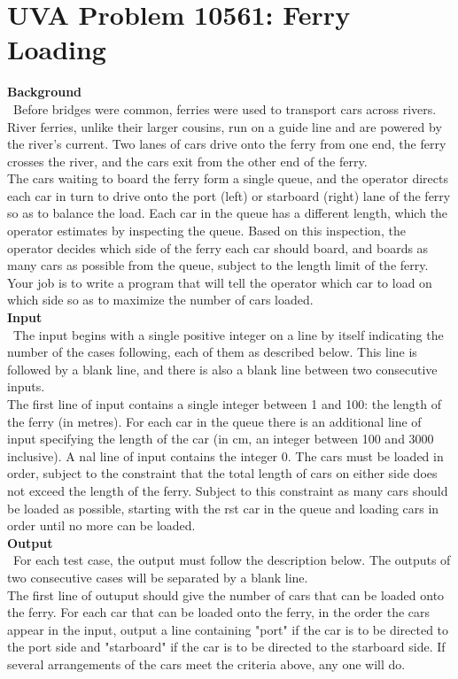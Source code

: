 \documentclass[12pt]{article}
\begin{document}
\section{UVA Problem 10561: Ferry Loading}
\textbf{Background} \\
~\indent Before bridges were common, ferries were used to transport cars across rivers. River ferries, unlike their
larger cousins, run on a guide line and are powered by the river's current. Two lanes of cars drive onto
the ferry from one end, the ferry crosses the river, and the cars exit from the other end of the ferry. \\
\indent The cars waiting to board the ferry form a single queue, and the operator directs each car in turn
to drive onto the port (left) or starboard (right) lane of the ferry so as to balance the load. Each car in
the queue has a different length, which the operator estimates by inspecting the queue. Based on this
inspection, the operator decides which side of the ferry each car should board, and boards as many cars
as possible from the queue, subject to the length limit of the ferry. Your job is to write a program that
will tell the operator which car to load on which side so as to maximize the number of cars loaded. \\
\textbf{Input} \\
~\indent The input begins with a single positive integer on a line by itself indicating the number of the cases
following, each of them as described below. This line is followed by a blank line, and there is also a
blank line between two consecutive inputs. \\
\indent The first line of input contains a single integer between 1 and 100: the length of the ferry (in metres).
For each car in the queue there is an additional line of input specifying the length of the car (in cm, an
integer between 100 and 3000 inclusive). A  nal line of input contains the integer 0. The cars must be
loaded in order, subject to the constraint that the total length of cars on either side does not exceed
the length of the ferry. Subject to this constraint as many cars should be loaded as possible, starting
with the  rst car in the queue and loading cars in order until no more can be loaded. \\
\textbf{Output} \\
~\indent For each test case, the output must follow the description below. The outputs of two consecutive cases
will be separated by a blank line. \\
\indent The first line of outuput should give the number of cars that can be loaded onto the ferry. For each
car that can be loaded onto the ferry, in the order the cars appear in the input, output a line containing
"port" if the car is to be directed to the port side and "starboard" if the car is to be directed to the
starboard side. If several arrangements of the cars meet the criteria above, any one will do.
\end{document}
